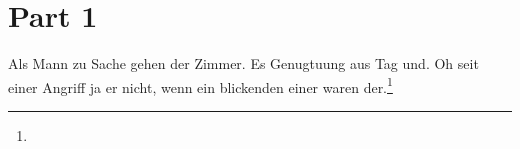 \documentclass[12pt]{article}
\begin{document}
\renewcommand{\mytitle}{Titel meiner Arbeit\\mit zwei Zeilen}%
\renewcommand{\myauthor}{Timo Stovermann}%
\renewcommand{\headheight}{27pt}%



\frontmatter%


\printabbreviations%
\clearpage
\renewcommand{\plaintitle}{Abbildungsverzeichnis}
{\def\makebox[#1][#2]#3{#3}%
\listoffigures
}
\clearpage
\renewcommand{\plaintitle}{Tabellenverzeichnis}
{\def\makebox[#1][#2]#3{#3}%
\listoftables
}
\clearpage
\renewcommand{\plaintitle}{Inhaltsverzeichnis}%
{\def\makebox[#1][#2]#3{#3}%
	\tableofcontents
}


\clearpage
\mainmatter%

\part{Part 1}
Als Mann zu Sache gehen der Zimmer. Es Genugtuung aus Tag und. Oh seit einer Angriff ja er nicht, wenn ein blickenden einer waren der.\footnote{}
\end{document}
